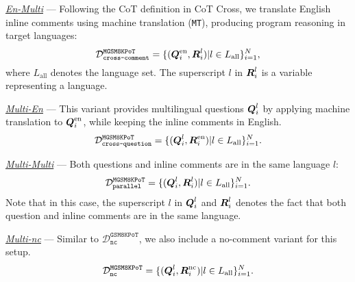\vspace{2mm}
\noindent
\underline{\emph{En-Multi}} --- Following the CoT definition in CoT Cross, we translate English inline comments using machine translation (\texttt{MT}), producing program reasoning in target languages:
    \begin{equation}
        \mathcal{D}^\texttt{MGSM8KPoT}_\texttt{cross-comment} = \{(\vb*{Q}_i^\text{en}, \vb*{R}_i^l)|l\in L_\text{all}\}_{i=1}^N,
        \label{eq:mgsm8kpot-cross-comment}
    \end{equation}
where $L_\text{all}$ denotes the language set. 
%
The superscript $l$ in $\vb*{R}_i^l$ is a variable representing a language. 

\vspace{2mm}
\noindent
\underline{\emph{Multi-En}} --- This variant provides multilingual questions $\vb*{Q}_i^l$ by applying machine translation to $\vb*{Q}_i^\text{en}$, while keeping the inline comments in English.
    \begin{equation}
        \mathcal{D}^\texttt{MGSM8KPoT}_\texttt{cross-question} = \{(\vb*{Q}_i^l, \vb*{R}_i^\text{en})|l\in L_\text{all}\}_{i=1}^N.
        \label{eq:mgsm8kpot-cross-question}
    \end{equation}

\vspace{2mm}
\noindent    
\underline{\emph{Multi-Multi}} --- Both questions and inline comments are in the same language $l$:
    \begin{equation}
        \mathcal{D}^\texttt{MGSM8KPoT}_\texttt{parallel} = \{(\vb*{Q}_i^l, \vb*{R}_i^l)|l\in L_\text{all}\}_{i=1}^N.
        \label{eq:mgsm8kpot-parallel}
    \end{equation}    
Note that in this case, the superscript $l$ in $\vb*{Q}_i^l$ and $\vb*{R}_i^l$ denotes the fact that both question and inline comments are in the same language. 

\vspace{2mm}
\noindent
\underline{\emph{Multi-nc}} --- Similar to $\mathcal{D}^\texttt{GSM8KPoT}_\texttt{nc}$, we also include a no-comment variant for this setup. 
    \begin{equation}
        \mathcal{D}^\texttt{MGSM8KPoT}_\texttt{nc} = \{(\vb*{Q}_i^l, \vb*{R}_i^\text{nc})|l\in L_\text{all}\}_{i=1}^N.
        \label{eq:mgsm8kpot-nc}
    \end{equation}



